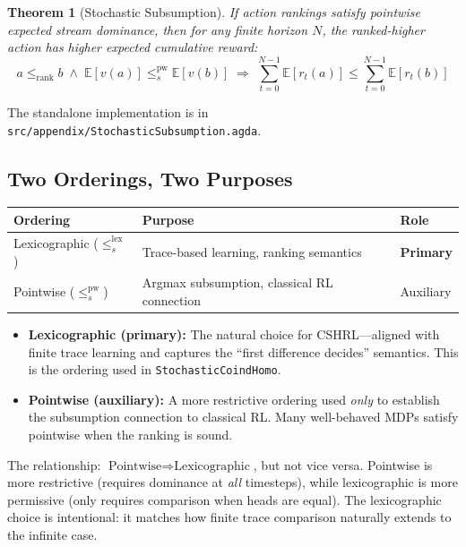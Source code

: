 \documentclass[9pt,a4paper]{article}
\theoremstyle{plain}
\newtheorem{theorem}{Theorem}
\theoremstyle{definition}
\theoremstyle{remark}
\begin{document}
\begin{theorem}[Stochastic Subsumption]
If action rankings satisfy pointwise expected stream dominance, then for any finite horizon $N$, the ranked-higher action has higher expected cumulative reward:
\[
a \le_{\text{rank}} b \;\wedge\; \mathbb{E}[v(a)] \le_s^{\text{pw}} \mathbb{E}[v(b)] \;\Longrightarrow\; \sum_{t=0}^{N-1} \mathbb{E}[r_t(a)] \le \sum_{t=0}^{N-1} \mathbb{E}[r_t(b)]
\]
\end{theorem}

The standalone implementation is in \texttt{src/appendix/StochasticSubsumption.agda}.

\subsection{Two Orderings, Two Purposes}

\begin{center}
\begin{tabular}{|l|l|l|}
\hline
\textbf{Ordering} & \textbf{Purpose} & \textbf{Role} \\
\hline
Lexicographic ($\le_s^{\text{lex}}$) & Trace-based learning, ranking semantics & \textbf{Primary} \\
Pointwise ($\le_s^{\text{pw}}$) & Argmax subsumption, classical RL connection & Auxiliary \\
\hline
\end{tabular}
\end{center}

\begin{itemize}
\item \textbf{Lexicographic (primary):} The natural choice for CSHRL---aligned with finite trace learning and captures the ``first difference decides'' semantics. This is the ordering used in \texttt{StochasticCoindHomo}.
\item \textbf{Pointwise (auxiliary):} A more restrictive ordering used \emph{only} to establish the subsumption connection to classical RL. Many well-behaved MDPs satisfy pointwise when the ranking is sound.
\end{itemize}

The relationship: $\text{Pointwise} \Rightarrow \text{Lexicographic}$, but not vice versa. Pointwise is more restrictive (requires dominance at \emph{all} timesteps), while lexicographic is more permissive (only requires comparison when heads are equal). The lexicographic choice is intentional: it matches how finite trace comparison naturally extends to the infinite case.
\end{document}
